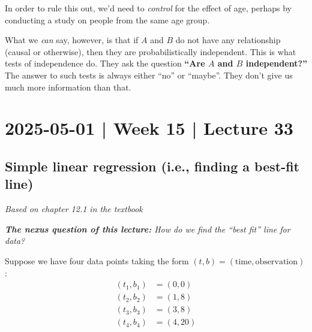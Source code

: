 \documentclass[10pt]{article}
\theoremstyle{definition}
\newcommand{\1}[1]{\textbf{1}_{\left[#1\right]}} %
\begin{document}
\begin{itemize}
  In order to rule this out, we'd need to \textit{control} for the effect of
  age, perhaps by conducting a study on people from the same age group.
\end{itemize}

What we \textit{can} say, however, is that if $A$ and $B$ do not have any
relationship (causal or otherwise), then they are probabilistically
independent. This is what tests of independence do. They ask the question
\textbf{``Are $A$ and $B$ independent?''} The answer to such tests is always
either ``no'' or ``maybe''. They don't give us much more information than
that.

\newpage
\section{2025-05-01 | Week 15 | Lecture 33}

\subsection{Simple linear regression (i.e., finding a best-fit line)}
\textit{Based on chapter 12.1 in the textbook}
\label{sec:finding-best-fit-line-with-linear-regression}
\begin{center}
  \begin{tcolorbox}[width=0.9\textwidth, colback=white, colframe=black]
    \textit{\textbf{The nexus question of this lecture:} How do we find the
      ``best fit'' line for data?}
  \end{tcolorbox}
\end{center}


Suppose we have four data points taking the form
$(t,b) = (\text{time}, \text{observation})$:
\begin{align*}
  (t_{1},b_{1}) &= (0,0)\\
  (t_{2},b_{2}) &= (1,8)\\
  (t_{3},b_{3}) &= (3,8)\\
  (t_{4},b_{4}) &= (4,20)
\end{align*}
\end{document}
